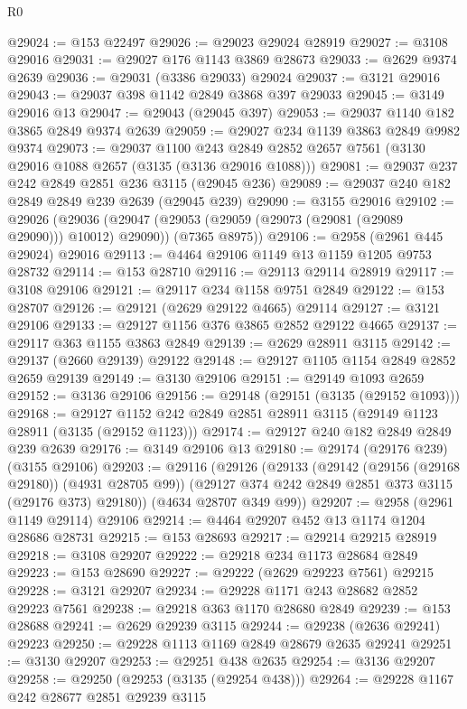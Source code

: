 \begin{lexlean}{R0}
\begin{coremodule}
@29024 := @153 @22497
@29026 := @29023 @29024 @28919
@29027 := @3108 @29016
@29031 := @29027 @176 @1143 @3869 @28673
@29033 := @2629 @9374 @2639
@29036 := @29031 (@3386 @29033) @29024
@29037 := @3121 @29016
@29043 := @29037 @398 @1142 @2849 @3868 @397 @29033
@29045 := @3149 @29016 @13
@29047 := @29043 (@29045 @397)
@29053 := @29037 @1140 @182 @3865 @2849 @9374 @2639
@29059 := @29027 @234 @1139 @3863 @2849 @9982 @9374
@29073 := @29037
    @1100
    @243
    @2849
    @2852
    @2657
    @7561
    (@3130 @29016 @1088 @2657 (@3135 (@3136 @29016 @1088)))
@29081 := @29037 @237 @242 @2849 @2851 @236 @3115 (@29045 @236)
@29089 := @29037 @240 @182 @2849 @2849 @239 @2639 (@29045 @239)
@29090 := @3155 @29016
@29102 := @29026
    (@29036
      (@29047 (@29053 (@29059 (@29073 (@29081 (@29089 @29090))) @10012) @29090))
      (@7365 @8975))
@29106 := @2958 (@2961 @445 @29024) @29016
@29113 := @4464 @29106 @1149 @13 @1159 @1205 @9753 @28732
@29114 := @153 @28710
@29116 := @29113 @29114 @28919
@29117 := @3108 @29106
@29121 := @29117 @234 @1158 @9751 @2849
@29122 := @153 @28707
@29126 := @29121 (@2629 @29122 @4665) @29114
@29127 := @3121 @29106
@29133 := @29127 @1156 @376 @3865 @2852 @29122 @4665
@29137 := @29117 @363 @1155 @3863 @2849
@29139 := @2629 @28911 @3115
@29142 := @29137 (@2660 @29139) @29122
@29148 := @29127 @1105 @1154 @2849 @2852 @2659 @29139
@29149 := @3130 @29106
@29151 := @29149 @1093 @2659
@29152 := @3136 @29106
@29156 := @29148 (@29151 (@3135 (@29152 @1093)))
@29168 := @29127 @1152 @242 @2849 @2851 @28911 @3115 (@29149 @1123 @28911 (@3135 (@29152 @1123)))
@29174 := @29127 @240 @182 @2849 @2849 @239 @2639
@29176 := @3149 @29106 @13
@29180 := @29174 (@29176 @239) (@3155 @29106)
@29203 := @29116
    (@29126
      (@29133
        (@29142 (@29156 (@29168 @29180)) (@4931 @28705 @99))
        (@29127 @374 @242 @2849 @2851 @373 @3115 (@29176 @373) @29180))
      (@4634 @28707 @349 @99))
@29207 := @2958 (@2961 @1149 @29114) @29106
@29214 := @4464 @29207 @452 @13 @1174 @1204 @28686 @28731
@29215 := @153 @28693
@29217 := @29214 @29215 @28919
@29218 := @3108 @29207
@29222 := @29218 @234 @1173 @28684 @2849
@29223 := @153 @28690
@29227 := @29222 (@2629 @29223 @7561) @29215
@29228 := @3121 @29207
@29234 := @29228 @1171 @243 @28682 @2852 @29223 @7561
@29238 := @29218 @363 @1170 @28680 @2849
@29239 := @153 @28688
@29241 := @2629 @29239 @3115
@29244 := @29238 (@2636 @29241) @29223
@29250 := @29228 @1113 @1169 @2849 @28679 @2635 @29241
@29251 := @3130 @29207
@29253 := @29251 @438 @2635
@29254 := @3136 @29207
@29258 := @29250 (@29253 (@3135 (@29254 @438)))
@29264 := @29228 @1167 @242 @28677 @2851 @29239 @3115

\end{coremodule}
\end{lexlean}

